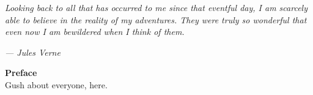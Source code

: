 
\begin{flushright}
\begin{minipage}[]{0.55\linewidth}
{\small \emph{Looking back to all that has occurred to me since that eventful
day, I am scarcely able to believe in the reality of my adventures. They 
were truly so wonderful that even now I am bewildered when I think of them.}}
    \begin{flushright}
        {\small \emph{--- Jules Verne} \hspace{0.5in} }
    \end{flushright}
\end{minipage}
\end{flushright}

{\Huge \bf Preface} \\

Gush about everyone, here.


